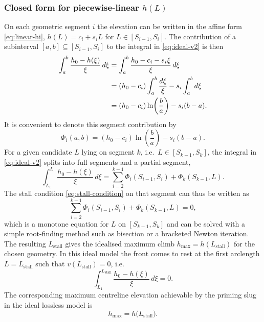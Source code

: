\documentclass[11pt]{article}
\begin{document}
\subsubsection*{Closed form for piecewise-linear $h(L)$}
On each geometric segment $i$ the elevation can be written in the affine form
\eqref{eq:linear-hi}, $h(L)=c_i+s_iL$ for $L\in [S_{i-1},S_i]$. The contribution of a
subinterval $[a,b]\subseteq [S_{i-1},S_i]$ to the integral in \eqref{eq:ideal-v2} is then
\begin{align}
  \int_{a}^{b} \frac{h_0 - h(\xi)}{\xi}\,d\xi
  &= \int_a^b \frac{h_0 - c_i - s_i\xi}{\xi}\,d\xi \notag\\
  &= (h_0-c_i)\int_a^b \frac{d\xi}{\xi} - s_i\int_a^b d\xi \notag\\
  &= (h_0-c_i)\ln\!\left(\frac{b}{a}\right) - s_i(b-a).
\end{align}
It is convenient to denote this segment contribution by
\begin{equation}
  \Phi_i(a,b) = (h_0-c_i)\ln\!\left(\frac{b}{a}\right) - s_i(b-a).
  \label{eq:Phi}
\end{equation}
For a given candidate $L$ lying on segment $k$, i.e.\ $L\in [S_{k-1},S_k]$, the integral in
\eqref{eq:ideal-v2} splits into full segments and a partial segment,
\begin{equation}
  \int_{L_1}^{L} \frac{h_0 - h(\xi)}{\xi}\,d\xi
  = \sum_{i=2}^{k-1} \Phi_i(S_{i-1},S_i) + \Phi_k(S_{k-1},L).
\end{equation}
The stall condition \eqref{eq:stall-condition} on that segment can thus be written as
\begin{equation}
  \sum_{i=2}^{k-1} \Phi_i(S_{i-1},S_i) + \Phi_k(S_{k-1},L) = 0,
  \label{eq:stall-piecewise}
\end{equation}
which is a monotone equation for $L$ on $[S_{k-1},S_k]$ and can be solved with a simple
root-finding method such as bisection or a bracketed Newton iteration. The resulting
$L_{\text{stall}}$ gives the idealised
maximum climb $h_{\max}=h(L_{\text{stall}})$ for the chosen geometry.
In this ideal model the front comes to rest at the first arclength $L = L_{\text{stall}}$ such that
$v(L_{\text{stall}}) = 0$, i.e.
\begin{equation}
  \int_{L_1}^{L_{\text{stall}}} \frac{h_0 - h(\xi)}{\xi}\,d\xi = 0.
  \label{eq:stall-condition}
\end{equation}
The corresponding maximum centreline elevation achievable by the priming slug in the ideal
lossless model is
\begin{equation}
  h_{\max} = h\bigl(L_{\text{stall}}\bigr).
  \label{eq:hmax}
\end{equation}
\end{document}
